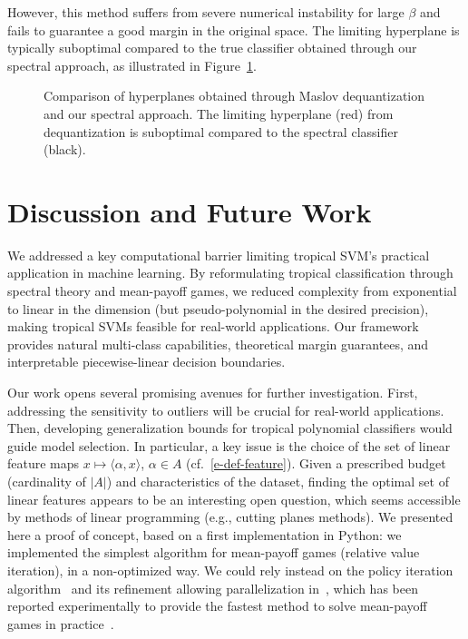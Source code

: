 \documentclass{article}
\def\<#1,#2>{\langle #1,#2\rangle}
\begin{document}
However, this method suffers from severe numerical instability for large $\beta$ and fails to guarantee a good margin in the original space. The limiting hyperplane is typically suboptimal compared to the true classifier obtained through our spectral approach, as illustrated in Figure~\ref{fig:maslov_dequantization}.

\begin{figure}[h]
    \centering
    \resizebox{0.6\textwidth}{!}{\clipbox{0.15\width{} 0.32\height{} 0.15\width{} 0.20\height{}}{}}
    \caption{Comparison of hyperplanes obtained through Maslov dequantization and our spectral approach. The limiting hyperplane (red) from dequantization is suboptimal compared to the spectral classifier (black).}
    \label{fig:maslov_dequantization}
\end{figure}

\section{Discussion and Future Work}\label{sec:discussion}

We addressed a key computational barrier limiting tropical SVM's practical application in machine learning. By reformulating tropical classification through spectral theory and mean-payoff games, we reduced complexity from exponential to linear in the dimension (but pseudo-polynomial in the desired precision),
making tropical SVMs feasible for real-world applications.
Our framework provides natural multi-class capabilities, theoretical margin guarantees, and interpretable piecewise-linear decision boundaries.

Our work opens several promising avenues for further investigation. First, addressing the sensitivity to outliers will be crucial for real-world applications. Then, developing generalization bounds for tropical polynomial classifiers would guide model selection. In particular, a key issue is the choice of the set of linear feature maps $x\mapsto \<\alpha,x>$, $\alpha\in A$ (cf.\ \eqref{e-def-feature}). Given a prescribed budget (cardinality of $|A|$) and characteristics
of the dataset, finding the optimal set of linear features
appears to be an interesting open question, which seems accessible
by methods of linear programming (e.g., cutting planes methods).
We presented here a proof of concept, based on a first implementation in Python: we implemented the simplest algorithm for mean-payoff games
(relative value iteration), in a non-optimized way. We could rely instead on the policy iteration algorithm~\cite{DG-06} and its refinement allowing parallelization in~\cite{chaloupkathesis}, which has been reported experimentally to provide the fastest method to solve mean-payoff
games in practice~\cite{chaloupka}.
\end{document}
